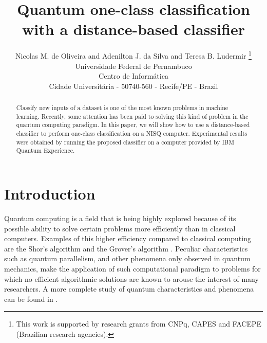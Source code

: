 \documentclass{esannV2}
\begin{document}
\title{Quantum one-class classification with a distance-based classifier}

\author{Nicolas M. de Oliveira and Adenilton J. da Silva and Teresa B. Ludermir
%
\thanks{This work is supported by research grants from CNPq, CAPES and FACEPE (Brazilian research agencies).}
%
\vspace{.3cm}\\
%
Universidade Federal de Pernambuco \\
Centro de Informática \\
Cidade Universitária - 50740-560 - Recife/PE - Brazil
}

\maketitle

\begin{abstract}
Classify new inputs of a dataset is one of the most known problems in machine learning. Recently, some attention has been paid to solving this kind of problem in the quantum computing paradigm. In this paper, we will show how to use a distance-based classifier to perform one-class classification on a NISQ computer. Experimental results were obtained by running the proposed classifier on a computer provided by IBM Quantum Experience.
\end{abstract}

\section{Introduction}

Quantum computing is a field that is being highly explored because of its possible ability to solve certain problems more efficiently than in classical computers. Examples of this higher efficiency compared to classical computing are the Shor's algorithm \cite{shor1994} and the Grover's algorithm \cite{grover1996}. Peculiar characteristics such as quantum parallelism, and other phenomena only observed in quantum mechanics, make the application of such computational paradigm to problems for which no efficient algorithmic solutions are known to arouse the interest of many researchers. A more complete study of quantum characteristics and phenomena can be found in \cite{nielsen2010quantum}.
\end{document}
